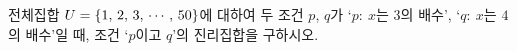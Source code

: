 전체집합 $U=\{1,\mkern3mu 2,\mkern3mu 3,\mkern3mu \cdots,\mkern3mu 50\}$에 대하여 두 조건 $p$, $q$가 `$p:\ x$는 $3$의 배수', `$q:\ x$는 $4$의 배수'일 때, 조건 `$p$이고 $q$'의 진리집합을 구하시오.
